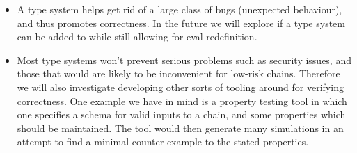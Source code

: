 \begin{itemize}
\item A type system helps get rid of a large class of bugs (unexpected
  behaviour), and thus promotes correctness. In the future we will explore if a
  type system can be added to \rad{} while still allowing for eval redefinition.
\item Most type systems won't prevent serious problems such as security issues,
  and those that would are likely to be inconvenient for low-risk chains.
  Therefore we will also investigate developing other sorts of tooling around
  \rad{} for verifying correctness. One example we have in mind is a property
  testing tool in which one specifies a schema for valid inputs to a chain, and
  some properties which should be maintained. The tool would then generate many
  simulations in an attempt to find a minimal counter-example to the stated
  properties.
\end{itemize}
